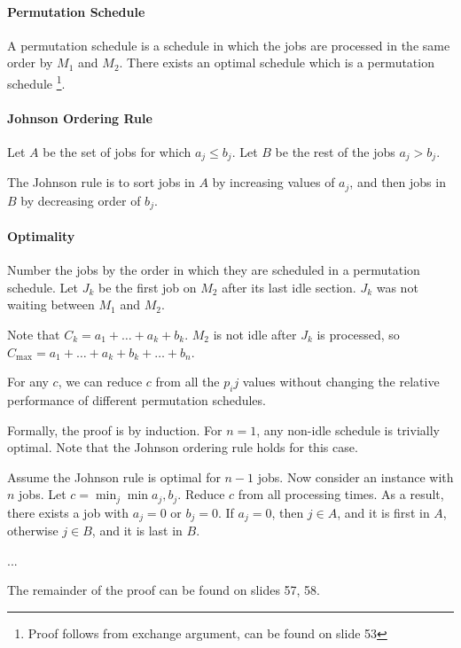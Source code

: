 \documentclass{idc_msc}
\begin{document}
\paragraph{Permutation Schedule}

A permutation schedule is a schedule in which the jobs are processed in the same order by \(M_1\) and \(M_2\).
There exists an optimal schedule which is a permutation schedule \footnote{Proof follows from exchange argument, can be found on slide 53}.

\paragraph{Johnson Ordering Rule}

Let \(A\) be the set of jobs for which \(a_j \le b_j\).
Let \(B\) be the rest of the jobs \(a_j > b_j\).

The Johnson rule is to sort jobs in \(A\) by increasing values of \(a_j\), and then jobs in \(B\) by decreasing order of \(b_j\).

\paragraph{Optimality}

Number the jobs by the order in which they are scheduled in a permutation schedule.
Let \(J_k\) be the first job on \(M_2\) after its last idle section.
\(J_k\) was not waiting between \(M_1\) and \(M_2\).

Note that \(C_k = a_1 + \ldots + a_k + b_k\).
\(M_2\) is not idle after \(J_k\) is processed, so \(C_{\max} = a_1 + \ldots + a_k + b_k + \ldots + b_n\).

For any \(c\), we can reduce \(c\) from all the \(p_ij\) values without changing the relative performance of different permutation schedules.

Formally, the proof is by induction.
For \(n=1\), any non-idle schedule is trivially optimal.
Note that the Johnson ordering rule holds for this case.

Assume the Johnson rule is optimal for \(n-1\) jobs.
Now consider an instance with \(n\) jobs.
Let \(c = \min_j \min a_j, b_j\). Reduce \(c\) from all processing times.
As a result, there exists a job with \(a_j=0\) or \(b_j=0\).
If \(a_j = 0\), then \(j \in A\), and it is first in \(A\), otherwise \(j \in B\), and it is last in \(B\).

...

The remainder of the proof can be found on slides 57, 58.
\end{document}
